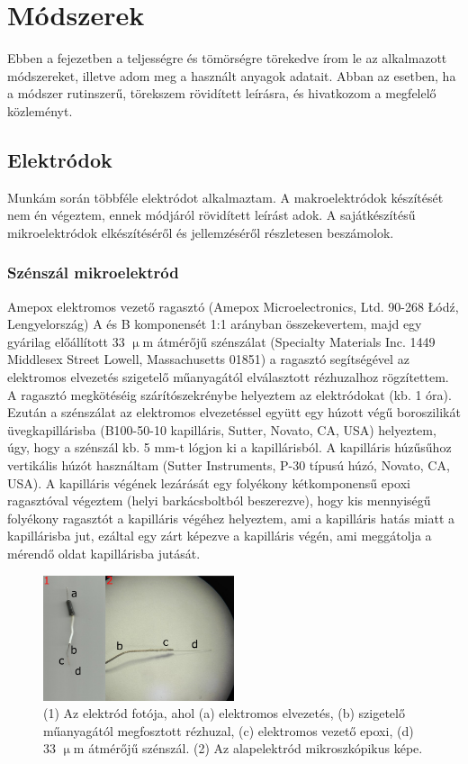 \chapter{Módszerek}
\pagestyle{headings}

Ebben a fejezetben a teljességre és tömörségre törekedve írom le az alkalmazott módszereket, illetve adom meg a használt anyagok adatait. Abban az esetben, ha a módszer rutinszerű, törekszem rövidített leírásra, és hivatkozom a megfelelő közleményt.

\section{Elektródok}

Munkám során többféle elektródot alkalmaztam. A makroelektródok készítését nem én végeztem, ennek módjáról rövidített leírást adok. A sajátkészítésű mikroelektródok elkészítéséről és jellemzéséről részletesen beszámolok.

\subsection{Szénszál mikroelektród}
Amepox elektromos vezető ragasztó (Amepox Microelectronics, Ltd. 90-268 Łódź, Lengyelország) A és B komponensét 1:1 arányban összekevertem, majd egy gyárilag előállított 33 $\upmu$m átmérőjű szénszálat (Specialty Materials Inc. 1449 Middlesex Street Lowell, Massachusetts 01851) a ragasztó segítségével az elektromos elvezetés szigetelő műanyagától elválasztott rézhuzalhoz rögzítettem. A ragasztó megkötéséig szárítószekrénybe helyeztem az elektródokat (kb. 1 óra). Ezután a szénszálat az elektromos elvezetéssel együtt egy húzott végű boroszilikát üvegkapillárisba (B100-50-10 kapilláris, Sutter, Novato, CA, USA) helyeztem, úgy, hogy a szénszál kb. 5 mm-t lógjon ki a kapillárisból. A kapilláris húzűsűhoz vertikális húzót használtam (Sutter Instruments, P-30 típusú húzó, Novato, CA, USA). A kapilláris végének lezárását egy folyékony kétkomponensű epoxi ragasztóval végeztem (helyi barkácsboltból beszerezve), hogy kis mennyiségű folyékony ragasztót a kapilláris végéhez helyeztem, ami a kapilláris hatás miatt a kapillárisba jut, ezáltal egy zárt képezve a kapilláris végén, ami meggátolja a mérendő oldat kapillárisba jutását.
\begin{figure}[!h]
\centering
\includegraphics[width=0.5\textwidth]{img/szen33.png}
\caption{(1) Az elektród fotója, ahol (a) elektromos elvezetés, (b) szigetelő műanyagától megfosztott rézhuzal, (c) elektromos vezető epoxi, (d) 33 $\upmu$m átmérőjű szénszál. (2) Az alapelektród mikroszkópikus képe.}
\label{fig:ionophores}
\end{figure}

